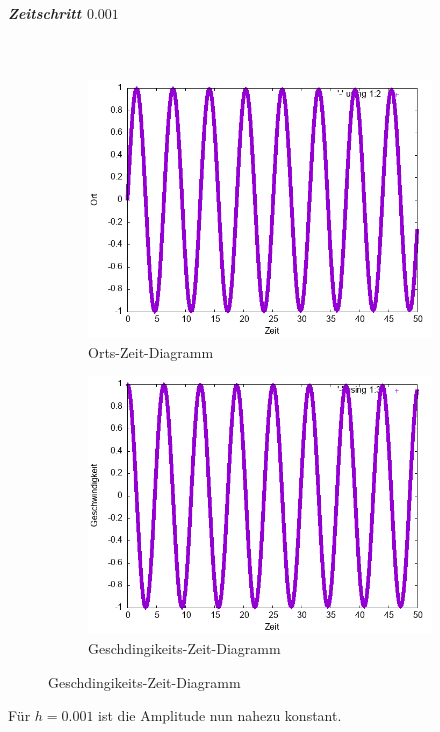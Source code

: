 \documentclass[
    oneside,
    ngerman,
    footinclude=false,
    captions=tableheading,
    DIV=12
]{scrartcl}
\begin{document}
            \subparagraph*{Zeitschritt $0.001$}\,
            \begin{figure}[H]
                \centering
                \begin{subfigure}[b]{0.45\textwidth}
                    \centering
                    \includegraphics[width=\textwidth]{Bilddateien/LLA1(a)-0001-0-x.png}
                    \caption{Orts-Zeit-Diagramm}
                    \label{fig:LLA1(a)-0001-0-x}
                \end{subfigure}
                \hfill
                \begin{subfigure}[b]{0.45\textwidth}
                    \centering
                    \includegraphics[width=\textwidth]{Bilddateien/LLA1(a)-0001-0-v.png}
                    \caption{Geschdingikeits-Zeit-Diagramm}
                    \label{fig:LLA1(a)-0001-0-v}
                \end{subfigure}
            \end{figure}
            Für $h=0.001$ ist die Amplitude nun nahezu konstant.
            
\end{document}
